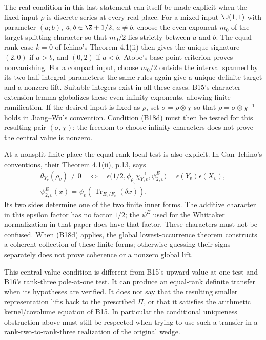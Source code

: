 The real condition in this last statement can itself be made
explicit when the fixed input $\rho$ is discrete series at every
real place. For a mixed input $\U(1,1)$ with parameter $(a;b)$,
$a,b\in\Z+1/2$, $a\ne b$, choose the even exponent $m_0$ of
the target splitting character so that $m_0/2$ lies strictly
between $a$ and $b$. The equal-rank case $k=0$ of Ichino's
Theorem 4.1(ii) then gives the unique signature $(2,0)$ if
$a>b$, and $(0,2)$ if $a<b$. Atobe's base-point criterion
proves nonvanishing. For a compact input, choose $m_0/2$
outside the interval spanned by its two half-integral parameters;
the same rules again give a unique definite target and a
nonzero lift. Suitable integers exist in all these cases.
B15's character-extension lemma globalizes these even infinity
exponents, allowing finite ramification. If the desired input
is fixed as $\rho$, set $\sigma=\rho\otimes\chi$ so that
$\rho=\sigma\otimes\chi^{-1}$ holds in Jiang--Wu's convention.
Condition (B18d) must then be tested for this resulting pair
$(\sigma,\chi)$; the freedom to choose infinity characters
does not prove the central value is nonzero.

At a nonsplit finite place the equal-rank local test is also
explicit. In Gan--Ichino's conventions, their Theorem 4.1(ii),
p.13, says
\[
 \begin{gathered}
 \theta_{Y_v}(\rho_v)\ne0
 \quad\Longleftrightarrow\quad
 \epsilon\bigl(1/2,\phi_{\rho_v}\chi_{Y,v}^{-1},
                      \psi_{2,v}^E\bigr)
               =\epsilon(Y_v)\epsilon(X_v),\\
 \psi_{2,v}^E(x)=\psi_v(\operatorname{Tr}_{E_v/F_v}(\delta x)).
 \end{gathered}
 \tag{B18e}
\]
Its two sides determine one of the two finite inner forms.
The additive character in this epsilon factor has no factor
$1/2$; the $\psi^E$ used for the Whittaker normalization in
that paper does have that factor. These characters must not be
confused. When (B18d) applies, the global lowest-occurrence
theorem constructs a coherent collection of these finite forms;
otherwise guessing their signs separately does not prove
coherence or a nonzero global lift.

This central-value condition is different from B15's upward
value-at-one test and B16's rank-three pole-at-one test. It can
produce an equal-rank definite transfer when its hypotheses are
verified. It does not say that the resulting smaller
representation lifts back to the prescribed $\Pi$, or that it
satisfies the arithmetic kernel/covolume equation of B15.
In particular the conditional uniqueness obstruction above
must still be respected when trying to use such a transfer in
a rank-two-to-rank-three realization of the original wedge.
